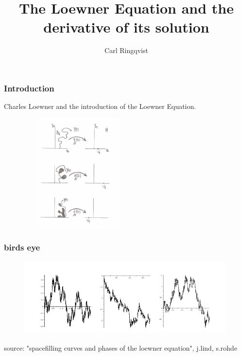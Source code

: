 \documentclass[10pt, compress]{beamer}
\title{The Loewner Equation and the derivative of its solution}
\subtitle{}
\author{Carl Ringqvist}
\institute{Master's Thesis presentation, KTH \& SU}
\begin{document}
\maketitle

\begin{frame}[fragile]
\frametitle{Introduction}
Charles Loewner and the introduction of the Loewner Equation.





\begin{figure}
  \centering
 \includegraphics[width=6cm,height=6cm]{firstex.png}
\end{figure}

\end{frame}

\begin{frame}[fragile]
  \frametitle{birds eye}
  


  

\begin{figure}
  \centering
 \includegraphics[width=11cm,height=4cm]{intro2.png}
\end{figure}
\tiny
source: "spacefilling curves and phases of the loewner equation", j.lind, s.rohde
\normalsize
\end{frame}
\end{document}
